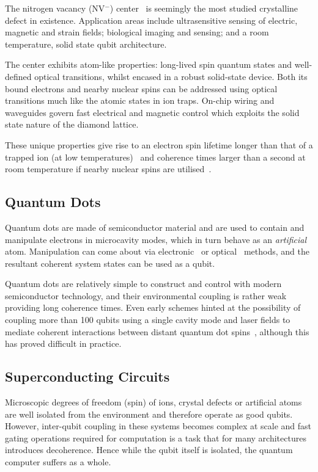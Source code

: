 The nitrogen vacancy (NV$^-$) center~\cite{Gruber1997} is seemingly the most studied crystalline defect in existence.
Application areas include ultrasensitive sensing of electric, magnetic and strain fields; biological imaging and sensing; and a room temperature, solid state qubit architecture.

The center exhibits atom-like properties: long-lived spin quantum states and well-defined optical transitions, whilst encased in a robust solid-state device.
Both its bound electrons and nearby nuclear spins can be addressed using optical transitions much like the atomic states in ion traps.
On-chip wiring and waveguides govern fast electrical and magnetic control which exploits the solid state nature of the diamond lattice.

These unique properties give rise to an electron spin lifetime longer than that of a trapped ion (at low temperatures)~\cite{Jarmola2012} and coherence times larger than a second at room temperature if nearby nuclear spins are utilised~\cite{Maurer2012}.

\subsection{Quantum Dots}
Quantum dots are made of semiconductor material and are used to contain and manipulate electrons in microcavity modes, which in turn behave as an \textit{artificial} atom.
Manipulation can come about via electronic~\cite{Chang1974} or optical~\cite{Dingle1974} methods, and the resultant coherent system states can be used as a qubit.

Quantum dots are relatively simple to construct and control with modern semiconductor technology, and their environmental coupling is rather weak providing long coherence times.
Even early schemes hinted at the possibility of coupling more than 100 qubits using a single cavity mode and laser fields to mediate coherent interactions between distant quantum dot spins~\cite{Imamoglu1999}, although this has proved difficult in practice.

\subsection{Superconducting Circuits}\label{sec:sccircuits}

Microscopic degrees of freedom (\eg spin) of ions, crystal defects or artificial atoms are well isolated from the environment and therefore operate as good qubits.
However, inter-qubit coupling in these systems becomes complex at scale and fast gating operations required for computation is a task that for many architectures introduces decoherence.
Hence while the qubit itself is isolated, the quantum computer suffers as a whole.

